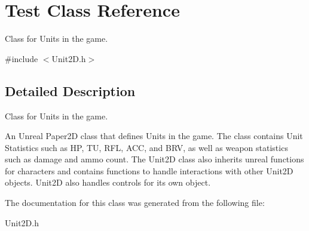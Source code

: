 \hypertarget{class_test}{}\section{Test Class Reference}
\label{class_test}


Class for Units in the game.  




{\ttfamily \#include $<$Unit2\+D.\+h$>$}



\subsection{Detailed Description}
Class for Units in the game. 

An Unreal Paper2D class that defines Units in the game. The class contains Unit Statistics such as HP, TU, R\+FL, A\+CC, and B\+RV, as well as weapon statistics such as damage and ammo count. The Unit2D class also inherits unreal functions for characters and contains functions to handle interactions with other Unit2D objects. Unit2D also handles controls for its own object. 

The documentation for this class was generated from the following file\+:\begin{DoxyCompactItemize}
\item 
Unit2\+D.\+h\end{DoxyCompactItemize}
